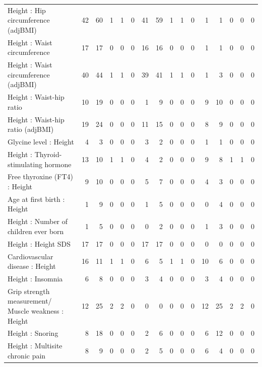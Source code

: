 \begin{table}[ht]
\begin{tabular}{lrrrrrrrrrrrrrrr}
  Height  : Hip circumference (adjBMI) &  42 &  60 &   1 &   1 &   0 &  41 &  59 &   1 &   1 &   0 &   1 &   1 &   0 &   0 &   0 \\ 
  Height  : Waist circumference  &  17 &  17 &   0 &   0 &   0 &  16 &  16 &   0 &   0 &   0 &   1 &   1 &   0 &   0 &   0 \\ 
  Height  : Waist circumference (adjBMI) &  40 &  44 &   1 &   1 &   0 &  39 &  41 &   1 &   1 &   0 &   1 &   3 &   0 &   0 &   0 \\ 
  Height  : Waist-hip ratio  &  10 &  19 &   0 &   0 &   0 &   1 &   9 &   0 &   0 &   0 &   9 &  10 &   0 &   0 &   0 \\ 
  Height  : Waist-hip ratio (adjBMI) &  19 &  24 &   0 &   0 &   0 &  11 &  15 &   0 &   0 &   0 &   8 &   9 &   0 &   0 &   0 \\ 
  Glycine level  : Height  &   4 &   3 &   0 &   0 &   0 &   3 &   2 &   0 &   0 &   0 &   1 &   1 &   0 &   0 &   0 \\ 
  Height  : Thyroid-stimulating hormone  &  13 &  10 &   1 &   1 &   0 &   4 &   2 &   0 &   0 &   0 &   9 &   8 &   1 &   1 &   0 \\ 
  Free thyroxine (FT4) : Height  &   9 &  10 &   0 &   0 &   0 &   5 &   7 &   0 &   0 &   0 &   4 &   3 &   0 &   0 &   0 \\ 
  Age at first birth  : Height  &   1 &   9 &   0 &   0 &   0 &   1 &   5 &   0 &   0 &   0 &   0 &   4 &   0 &   0 &   0 \\ 
  Height  : Number of children ever born  &   1 &   5 &   0 &   0 &   0 &   0 &   2 &   0 &   0 &   0 &   1 &   3 &   0 &   0 &   0 \\ 
  Height  : Height SDS &  17 &  17 &   0 &   0 &   0 &  17 &  17 &   0 &   0 &   0 &   0 &   0 &   0 &   0 &   0 \\ 
  Cardiovascular disease : Height  &  16 &  11 &   1 &   1 &   0 &   6 &   5 &   1 &   1 &   0 &  10 &   6 &   0 &   0 &   0 \\ 
  Height  : Insomnia &   6 &   8 &   0 &   0 &   0 &   3 &   4 &   0 &   0 &   0 &   3 &   4 &   0 &   0 &   0 \\ 
  Grip strength measurement/ Muscle weakness : Height  &  12 &  25 &   2 &   2 &   0 &   0 &   0 &   0 &   0 &   0 &  12 &  25 &   2 &   2 &   0 \\ 
  Height  : Snoring &   8 &  18 &   0 &   0 &   0 &   2 &   6 &   0 &   0 &   0 &   6 &  12 &   0 &   0 &   0 \\ 
  Height  : Multisite chronic pain &   8 &   9 &   0 &   0 &   0 &   2 &   5 &   0 &   0 &   0 &   6 &   4 &   0 &   0 &   0 \\ 

\end{tabular}
\end{table}
